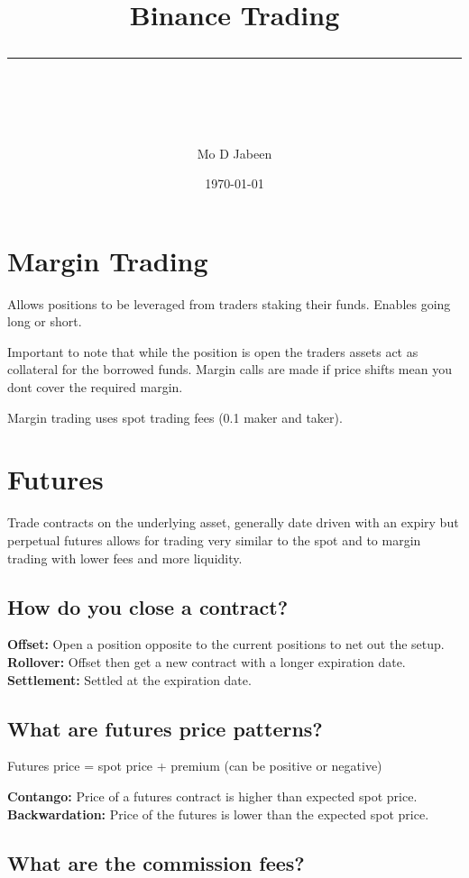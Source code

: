 \documentclass[11pt]{scrartcl} %
\title{	
	\normalfont\normalsize
	\vspace{20pt} %
	{\huge Binance Trading}\\ %
	\vspace{12pt} %
	\rule{\linewidth}{2pt}\\ %
}
\author{\small Mo D Jabeen} %
\date{\normalsize\today} %
\begin{document}
\maketitle %

\section{Margin Trading}

Allows positions to be leveraged from traders staking their funds. Enables going long or short.

Important to note that while the position is open the traders assets act as collateral for the borrowed
funds. Margin calls are made if price shifts mean you dont cover the required margin.

Margin trading uses spot trading fees (0.1 maker and taker).

\section{Futures}

Trade contracts on the underlying asset, generally date driven with an expiry but perpetual futures allows
for trading very similar to the spot and to margin trading with lower fees and more liquidity.

\subsection{How do you close a contract?}

\textbf{Offset:} Open a position opposite to the current positions to net out the setup.\\
\textbf{Rollover:} Offset then get a new contract with a longer expiration date.\\
\textbf{Settlement:} Settled at the expiration date.

\subsection{What are futures price patterns?}

Futures price = spot price + premium (can be positive or negative)

\textbf{Contango:} Price of a futures contract is higher than expected spot price.\\
\textbf{Backwardation:} Price of the futures is lower than the expected spot price.

\subsection{What are the commission fees?}
\end{document}
